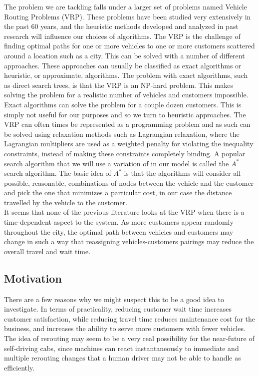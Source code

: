\documentclass[Proceedings]{ascelike}
\begin{document}
The problem we are tackling falls under a larger set of problems named Vehicle Routing Problems (VRP). These problems have been studied very extensively in the past 60 years\cite{VRP}\cite{SA}, and the heuristic methods developed and analyzed in past research will influence our choices of algorithms. The VRP is the challenge of finding optimal paths for one or more vehicles to one or more customers scattered around a location such as a city. This can be solved with a number of different approaches. These approaches can usually be classified as exact algorithms or heuristic, or approximate, algorithms. The problem with exact algorithms, such as direct search trees, is that the VRP is an NP-hard problem. This makes solving the problem for a realistic number of vehicles and customers impossible. Exact algorithms can solve the problem for a couple dozen customers\cite{Exact}. This is simply not useful for our purposes and so we turn to heuristic approaches. The VRP can often times be represented as a programming problem and as such can be solved using relaxation methods such as Lagrangian relaxation, where the Lagrangian multipliers are used as a weighted penalty for violating the inequality constraints, instead of making these constraints completely binding. A popular search algorithm that we will use a variation of in our model is called the $A^*$ search algorithm. The basic idea of $A^*$ is that the algorithms will consider all possible, reasonable, combinations of nodes between the vehicle and the customer and pick the one that minimizes a particular cost, in our case the distance travelled by the vehicle to the customer. \\

It seems that none of the previous literature looks at the VRP when there is a time-dependent aspect to the system. As more customers appear randomly throughout the city, the optimal path between vehicles and customers may change in such a way that reassigning vehicles-customers pairings may reduce the overall travel and wait time.

\subsection*{Motivation}

There are a few reasons why we might suspect this to be a good idea to investigate. In terms of practicality, reducing customer wait time increases customer satisfaction, while reducing travel time reduces maintenance cost for the business, and increases the ability to serve more customers with fewer vehicles. The idea of rerouting may seem to be a very real possibility for the near-future of self-driving cabs, since machines can react instantaneously to immediate and multiple rerouting changes that a human driver may not be able to handle as efficiently.
\end{document}
